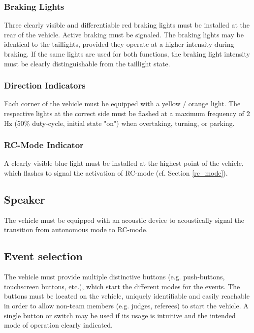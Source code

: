 \subsubsection{Braking Lights}

Three clearly visible and differentiable red braking lights must be installed at the rear of the vehicle.
Active braking must be signaled.
The braking lights may be identical to the taillights, provided they operate at a higher intensity during braking.
    If the same lights are used for both functions, the braking light intensity must be clearly distinguishable from the taillight state.

\subsubsection{Direction Indicators}

Each corner of the vehicle must be equipped with a yellow / orange light.
The respective lights at the correct side must be flashed at a maximum frequency of 2 Hz (50\% duty-cycle, initial state "on") when overtaking, turning, or parking.

\subsubsection{RC-Mode Indicator}

A clearly visible blue light must be installed at the highest point of the vehicle, which flashes to signal the activation of RC-mode (cf. Section \ref{rc_mode}).

\subsection{Speaker}

The vehicle must be equipped with an acoustic device to acoustically signal the transition from autonomous mode to RC-mode.


\subsection{Event selection}
\label{event_selection}

The vehicle must provide multiple distinctive buttons (e.g. push-buttons, touchscreen buttons, etc.), which start the different modes for the events.
The buttons must be located on the vehicle, uniquely identifiable and easily reachable in order to allow non-team members (e.g. judges, referees) to start the vehicle.
A single button or switch may be used if its usage is intuitive and the intended mode of operation clearly indicated.

